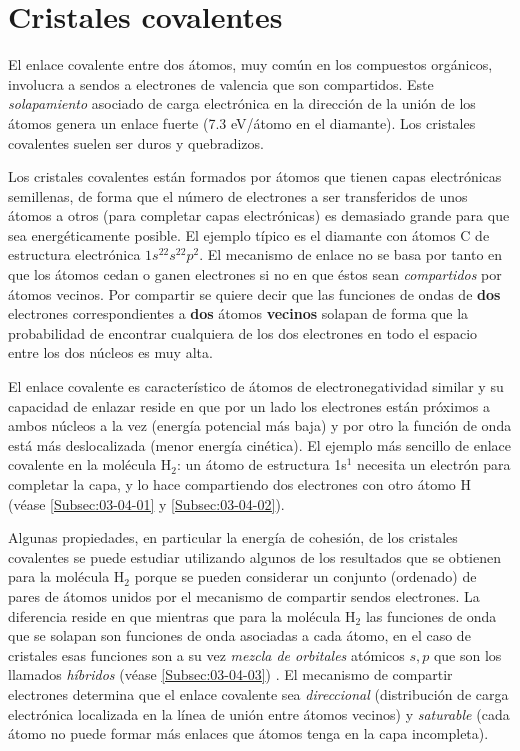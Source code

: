 \section{Cristales covalentes}

El enlace covalente entre dos átomos, muy común en los compuestos orgánicos, involucra a sendos a electrones de valencia  que son compartidos. Este \textit{solapamiento} asociado de carga electrónica en la dirección de la unión de los átomos genera un enlace fuerte (7.3 eV/átomo en el diamante). Los cristales covalentes suelen ser duros y quebradizos. 

Los cristales covalentes están formados por átomos que tienen capas electrónicas semillenas, de forma que el número de electrones a ser transferidos de unos átomos a otros (para completar capas electrónicas) es demasiado grande para que sea energéticamente posible. El ejemplo típico es el diamante con átomos C de estructura electrónica $1s^22s^22p^2$. El mecanismo de enlace no se basa por tanto en que los átomos cedan o ganen electrones si no en que éstos sean \textit{compartidos} por átomos vecinos. Por compartir se quiere decir que las funciones de ondas de \textbf{dos} electrones correspondientes a \textbf{dos} átomos \textbf{vecinos} solapan de forma que la probabilidad de encontrar cualquiera de los dos electrones en todo el espacio entre los dos núcleos es muy alta. 

El enlace covalente es característico de átomos de electronegatividad similar y su capacidad de enlazar reside en que por un lado los electrones están próximos a ambos núcleos a la vez (energía potencial más baja) y por otro la función de onda está más deslocalizada (menor energía cinética). El ejemplo más sencillo de enlace covalente en la molécula H$_2$: un átomo de estructura 1s$^1$ necesita un electrón para completar la capa, y lo hace compartiendo dos electrones con otro átomo H (véase \ref{Subsec:03-04-01} y \ref{Subsec:03-04-02}). 

Algunas propiedades, en particular la energía de cohesión, de los cristales covalentes se puede estudiar utilizando algunos de los resultados que se obtienen para la molécula H$_2$ porque se pueden considerar un conjunto (ordenado) de pares de átomos unidos por el mecanismo de compartir sendos electrones. La diferencia reside en que mientras que para la molécula H$_2$ las funciones de onda que se solapan son funciones de onda asociadas a cada átomo, en el caso de cristales esas funciones son a su vez \textit{mezcla de orbitales} atómicos $s,p$ que son los llamados \textit{híbridos} (véase \ref{Subsec:03-04-03}) . El mecanismo de compartir electrones determina que el enlace covalente sea \textit{direccional} (distribución de carga electrónica localizada en la línea de unión entre átomos vecinos) y \textit{saturable} (cada átomo no puede formar más enlaces que átomos tenga en la capa incompleta).

